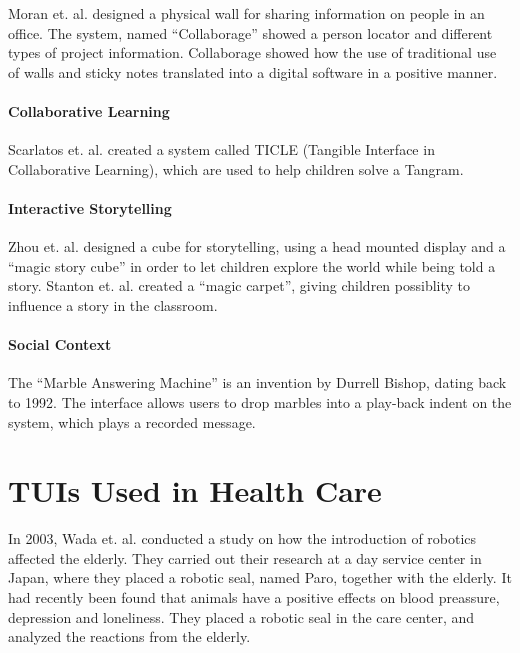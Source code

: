 Moran et. al. designed a physical wall for sharing information on people in an office\cite{moran1999design}. The system, named ``Collaborage'' showed a person locator and different types of project information. Collaborage showed how the use of traditional use of walls and sticky notes translated into a digital software in a positive manner.


\paragraph{Collaborative Learning} \newline
Scarlatos et. al. created a system called TICLE (Tangible Interface in Collaborative Learning), which are used to help children solve a Tangram\cite{scarlatos1999ticle}.  


\paragraph{Interactive Storytelling} \newline
Zhou et. al. designed a cube for storytelling, using a head mounted display and a ``magic story cube'' in order to let children explore the world while being told a story\cite{zhou2004magic}. Stanton et. al. created a ``magic carpet'', giving children possiblity to influence a story in the classroom\cite{stanton2001classroom}. 

 
\paragraph{Social Context} \newline
The ``Marble Answering Machine'' is an invention by Durrell Bishop, dating back to 1992\cite{crampton1995hand}. The interface allows users to drop marbles into a play-back indent on the system, which plays a recorded message.   


\section{TUIs Used in Health Care}
\label{sec:effectofrobots}
In 2003, Wada et. al. conducted a study on how the introduction of robotics affected the elderly\cite{wada2004effects}. They carried out their research at a day service center in Japan, where they placed a robotic seal, named Paro, together with the elderly. It had recently been found that animals have a positive effects on blood preassure, depression and loneliness. They placed a robotic seal in the care center, and analyzed the reactions from the elderly. 

